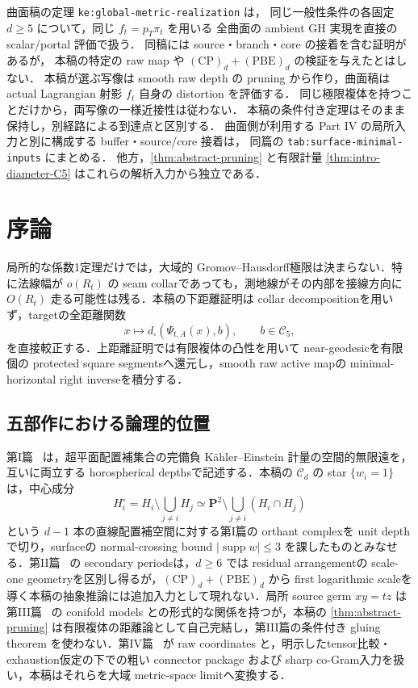 \documentclass[a4paper,11pt]{ltjsarticle}
\numberwithin{equation}{section}
\theoremstyle{plain}
\theoremstyle{definition}
\theoremstyle{remark}
\newcommand{\PP}{\mathbf P}
\newcommand{\supp}{\operatorname{supp}}
\newcommand{\Cd}{\mathcal C_d}
\begin{document}
曲面稿\cite{SurfaceCurrent}の定理 \texttt{ke:global-metric-realization} は，
同じ一般性条件の各固定 $d\ge5$ について，同じ $f_t=p_T\pi_t$ を用いる
全曲面の ambient GH 実現を直接の scalar/portal 評価で扱う．
同稿には source・branch・core の接着を含む証明があるが，
本稿の特定の raw map や $\mathrm{(CP)}_d+\mathrm{(PBE)}_d$ の検証を与えたとはしない．
本稿が選ぶ写像は smooth raw depth の pruning から作り，曲面稿は
actual Lagrangian 射影 $f_t$ 自身の distortion を評価する．
同じ極限複体を持つことだけから，両写像の一様近接性は従わない．
本稿の条件付き定理はそのまま保持し，別経路による到達点と区別する．
曲面側が利用する Part IV の局所入力と別に構成する buffer・source/core 接着は，
同篇の \texttt{tab:surface-minimal-inputs} にまとめる．
他方，\cref{thm:abstract-pruning} と有限計量 \cref{thm:intro-diameter-C5} はこれらの解析入力から独立である．

\tableofcontents

\section{序論}\label{main2:intro}
局所的な係数1定理だけでは，大域的 Gromov--Hausdorff極限は決まらない．特に法線幅が $o(R_t)$ の seam collarであっても，測地線がその内部を接線方向に $O(R_t)$ 走る可能性は残る．本稿の下距離証明は collar decompositionを用いず，targetの全距離関数
\[
 x\longmapsto d_\square(\Psi_{t,A}(x),b),\qquad b\in\mathcal C_5,
\]
を直接較正する．上距離証明では有限複体の凸性を用いて near-geodesicを有限個の protected square segmentsへ還元し，smooth raw active mapの minimal-horizontal right inverseを積分する．

\subsection{五部作における論理的位置}
第I篇~\cite{SeriesI} は，超平面配置補集合の完備負 Kähler--Einstein 計量の空間的無限遠を，互いに両立する horospherical depthsで記述する．本稿の $\Cd$ の star $\{w_i=1\}$ は，中心成分
\[
 H_i^\circ=H_i\setminus\bigcup_{j\ne i}H_j
 \simeq\PP^2\setminus\bigcup_{j\ne i}(H_i\cap H_j)
\]
という $d-1$ 本の直線配置補空間に対する第I篇の orthant complexを unit depthで切り，surfaceの normal-crossing bound $|\supp w|\le3$ を課したものとみなせる．第II篇~\cite{SeriesII} の secondary periodsは，$d\ge6$ では residual arrangementの scale-one geometryを区別し得るが，$\mathrm{(CP)}_d+\mathrm{(PBE)}_d$ から first logarithmic scaleを導く本稿の抽象推論には追加入力として現れない．局所 source germ $xy=tz$ は第III篇~\cite{SeriesIII} の conifold models との形式的な関係を持つが，本稿の \cref{thm:abstract-pruning} は有限複体の距離論として自己完結し，第III篇の条件付き gluing theorem を使わない．第IV篇~\cite{SeriesIV} が raw coordinates と，明示したtensor比較・exhaustion仮定の下での粗い connector package および sharp co-Gram入力を扱い，本稿はそれらを大域 metric-space limitへ変換する．
\end{document}
